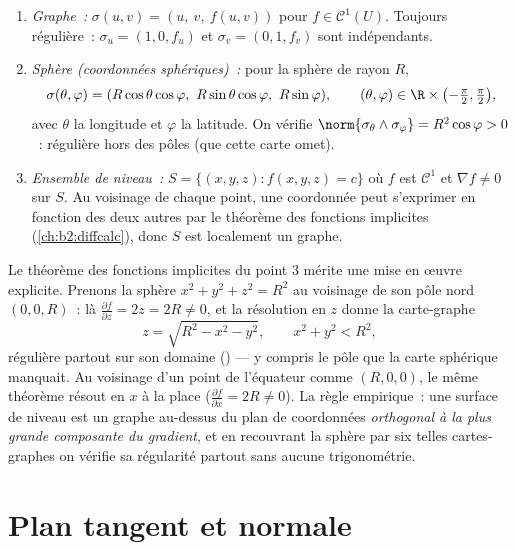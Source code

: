 \begin{example}\label{ex:b2:surfaces:standard}
\leavevmode
\begin{enumerate}
\item \emph{Graphe~:} $\sigma(u, v) = (u,\ v,\ f(u, v))$ pour $f \in
\mathcal{C}^1(U)$. Toujours régulière~: $\sigma_u = (1, 0, f_u)$ et
$\sigma_v = (0, 1, f_v)$ sont indépendants.
\item \emph{Sphère (coordonnées sphériques)~:} pour la sphère de
rayon $R$,
\[
\sigma(\theta, \varphi)
= (R\cos\theta\cos\varphi,\ R\sin\theta\cos\varphi,\
R\sin\varphi),
\qquad
(\theta, \varphi) \in \R \times
\bigl(-\tfrac\pi2, \tfrac\pi2\bigr),
\]
avec $\theta$ la longitude et $\varphi$ la latitude. On vérifie
$\norm{\sigma_\theta \wedge \sigma_\varphi} = R^2\cos\varphi > 0$~:
régulière hors des pôles (que cette carte omet).
\item \emph{Ensemble de niveau~:} $S = \{(x,y,z) : f(x, y, z) = c\}$ où
$f$ est $\mathcal{C}^1$ et $\nabla f \neq 0$ sur $S$. Au voisinage de chaque
point, une coordonnée peut s'exprimer en fonction des deux
autres par le théorème des fonctions implicites (\cref{ch:b2:diffcalc}), donc
$S$ est localement un graphe.
\end{enumerate}
\end{example}

\begin{example}
\label{ex:b2:surfaces:levelgraph}
Le théorème des fonctions implicites du point 3 mérite une mise
en œuvre explicite. Prenons la sphère $x^2 + y^2 + z^2 = R^2$ au
voisinage de son pôle nord $(0, 0, R)$~: là $\frac{\partial f}{\partial z} = 2z =
2R \neq 0$, et la résolution en $z$ donne la carte-graphe
\[
z = \sqrt{R^2 - x^2 - y^2},
\qquad x^2 + y^2 < R^2 ,
\]
régulière partout sur son domaine () --- y compris le
pôle que la carte sphérique manquait. Au voisinage d'un point de
l'équateur comme $(R, 0, 0)$, le même théorème résout en $x$ à la
place ($\frac{\partial f}{\partial x} = 2R \neq 0$). La règle
empirique~: une surface de niveau est un graphe au-dessus du plan
de coordonnées \emph{orthogonal à la plus grande composante du
gradient}, et en recouvrant la sphère par six telles
cartes-graphes on vérifie sa régularité partout sans aucune
trigonométrie.
\end{example}

\section{Plan tangent et normale}

